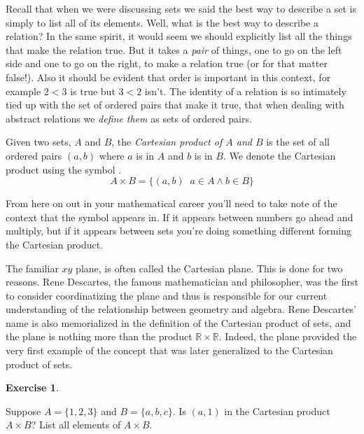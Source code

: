 \documentclass[10pt,]{book}
\theoremstyle{plain}
\theoremstyle{definition}
\theoremstyle{definition}
\newtheorem{exercise}[theorem]{Exercise}
\numberwithin{equation}{section}
\newcommand{\suchthat}{\;  \;}
\newcommand{\Reals}{{\mathbb R}}
\newcommand{\lt}{ < }
\begin{document}
    Recall that when we were discussing sets we said the best way to describe
    a set is simply to list all of its elements. Well, what is the best
    way to describe a relation? In the same spirit, it would seem we should
    explicitly list all the things that make the relation true. But it takes
    a \emph{pair} of things, one to go on the left side and one to go on the
    right, to make a relation true (or for that matter false!). Also it should
    be evident that order is important in this context, for example \(2\lt 3\) is true
    but \(3\lt 2\) isn't. The identity of a relation is so intimately tied up with
    the set of ordered pairs that make it true, that when dealing with abstract
    relations we \emph{define them} as sets of ordered pairs.
\par

    Given two sets, \(A\) and \(B\), the 
    \emph{Cartesian product of \(A\) and \(B\)}
    is the set of all ordered pairs \((a,b)\) where \(a\) is in \(A\) and \(b\) is in \(B\).
    We denote the Cartesian product using the symbol \texttimes{}.
    \begin{equation*}
      A \times B = \{ (a,b) \suchthat a \in A \land b \in B \}
    \end{equation*}
\par

    From here on out
    in your mathematical career you'll need to take note of the context that
    the symbol \texttimes{} appears in. If it appears between numbers go ahead and
    multiply, but if it appears between sets you're doing something different \textemdash{} forming the Cartesian product.
\par

    The familiar \(x\)\textendash{}\(y\) plane, is often called the Cartesian plane. This
    is done for two reasons. Rene Descartes, the famous
    mathematician and philosopher, was the first to consider coordinatizing
    the plane and thus is responsible for our current understanding of the
    relationship between geometry and algebra. Rene Descartes' name is also
    memorialized in the definition of the Cartesian product of sets, and the
    plane is nothing more than the product \(\Reals \times \Reals\). Indeed,
    the plane provided the very first example of the concept that was later
    generalized to the Cartesian product of sets.
\begin{exercise}\label{exercise-47}

        Suppose \(A = \{1,2,3\}\) and \(B = \{a,b,c\}\). Is \((a,1)\) in the Cartesian
        product \(A \times B\)? List all elements of \(A \times B\).
\end{exercise}
\par
\end{document}
